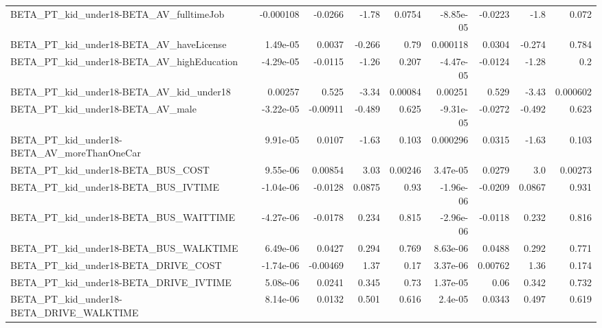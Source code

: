 \begin{tabular}{lrrrrrrrr}
BETA\_PT\_kid\_under18-BETA\_AV\_fulltimeJob            &   -0.000108 &      -0.0266 &    -1.78 &   0.0754 &  -8.85e-05 &     -0.0223 &         -1.8 &         0.072 \\
BETA\_PT\_kid\_under18-BETA\_AV\_haveLicense            &    1.49e-05 &       0.0037 &   -0.266 &     0.79 &   0.000118 &      0.0304 &       -0.274 &         0.784 \\
BETA\_PT\_kid\_under18-BETA\_AV\_highEducation          &   -4.29e-05 &      -0.0115 &    -1.26 &    0.207 &  -4.47e-05 &     -0.0124 &        -1.28 &           0.2 \\
BETA\_PT\_kid\_under18-BETA\_AV\_kid\_under18            &     0.00257 &        0.525 &    -3.34 &  0.00084 &    0.00251 &       0.529 &        -3.43 &      0.000602 \\
BETA\_PT\_kid\_under18-BETA\_AV\_male                   &   -3.22e-05 &     -0.00911 &   -0.489 &    0.625 &  -9.31e-05 &     -0.0272 &       -0.492 &         0.623 \\
BETA\_PT\_kid\_under18-BETA\_AV\_moreThanOneCar         &    9.91e-05 &       0.0107 &    -1.63 &    0.103 &   0.000296 &      0.0315 &        -1.63 &         0.103 \\
BETA\_PT\_kid\_under18-BETA\_BUS\_COST                  &    9.55e-06 &      0.00854 &     3.03 &  0.00246 &   3.47e-05 &      0.0279 &          3.0 &       0.00273 \\
BETA\_PT\_kid\_under18-BETA\_BUS\_IVTIME                &   -1.04e-06 &      -0.0128 &   0.0875 &     0.93 &  -1.96e-06 &     -0.0209 &       0.0867 &         0.931 \\
BETA\_PT\_kid\_under18-BETA\_BUS\_WAITTIME              &   -4.27e-06 &      -0.0178 &    0.234 &    0.815 &  -2.96e-06 &     -0.0118 &        0.232 &         0.816 \\
BETA\_PT\_kid\_under18-BETA\_BUS\_WALKTIME              &    6.49e-06 &       0.0427 &    0.294 &    0.769 &   8.63e-06 &      0.0488 &        0.292 &         0.771 \\
BETA\_PT\_kid\_under18-BETA\_DRIVE\_COST                &   -1.74e-06 &     -0.00469 &     1.37 &     0.17 &   3.37e-06 &     0.00762 &         1.36 &         0.174 \\
BETA\_PT\_kid\_under18-BETA\_DRIVE\_IVTIME              &    5.08e-06 &       0.0241 &    0.345 &     0.73 &   1.37e-05 &        0.06 &        0.342 &         0.732 \\
BETA\_PT\_kid\_under18-BETA\_DRIVE\_WALKTIME            &    8.14e-06 &       0.0132 &    0.501 &    0.616 &    2.4e-05 &      0.0343 &        0.497 &         0.619 \\

\end{tabular}
